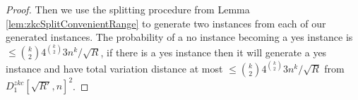 \begin{proof}
	Then we use the splitting procedure from Lemma \ref{lem:zkcSplitConvenientRange} to generate two instances from each of our generated instances. The probability of a no instance becoming a yes instance is $\leq \binom{k}{2}4^{\binom{k}{2}}3 n^k/\sqrt{R}$, if there is a yes instance then it will generate a yes instance and have total variation distance at most $\leq \binom{k}{2}4^{\binom{k}{2}}3 n^k/\sqrt{R}$ from $D^{zkc}_{1}[\sqrt{R'},n]^2$.
\end{proof}
